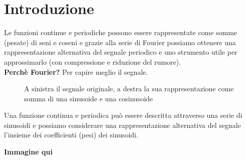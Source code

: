 \documentclass[12pt, a4paper]{report}
\begin{document}
\section{Introduzione}
Le funzioni continue e periodiche possono essere rappresentate come somme (pesate) di seni e coseni e grazie alla serie di Fourier possiamo ottenere una rappresentazione alternativa del segnale periodico e uno strumento utile per approssimarlo (con compressione e riduzione del rumore).\\
\textbf{Perchè Fourier?} Per capire meglio il segnale.
\begin{center}
    \begin{figure}[h!]
        \centering
        \caption{A sinistra il segnale originale, a destra la sua rappresentazione come somma di una sinusoide e una cosinusoide}
    \end{figure}    
\end{center}
Una funzione continua e periodica può essere descritta attraverso una serie di sinusoidi e possiamo considerare una rappresentazione alternativa del segnale l'insieme dei coefficienti (pesi) dei sinusoidi.
\begin{center}
    \textbf{Immagine qui}
\end{center}
\end{document}
